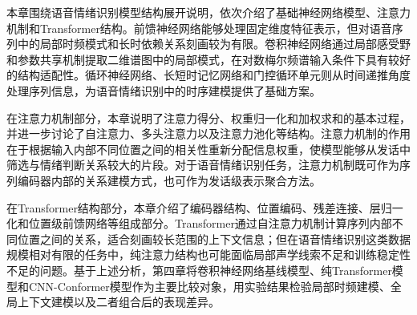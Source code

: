 本章围绕语音情绪识别模型结构展开说明，依次介绍了基础神经网络模型、注意力机制和Transformer结构。前馈神经网络能够处理固定维度特征表示，但对语音序列中的局部时频模式和长时依赖关系刻画较为有限。卷积神经网络通过局部感受野和参数共享机制提取二维谱图中的局部模式，在对数梅尔频谱输入条件下具有较好的结构适配性。循环神经网络、长短时记忆网络和门控循环单元则从时间递推角度处理序列信息，为语音情绪识别中的时序建模提供了基础方案。

在注意力机制部分，本章说明了注意力得分、权重归一化和加权求和的基本过程，并进一步讨论了自注意力、多头注意力以及注意力池化等结构。注意力机制的作用在于根据输入内部不同位置之间的相关性重新分配信息权重，使模型能够从发话中筛选与情绪判断关系较大的片段。对于语音情绪识别任务，注意力机制既可作为序列编码器内部的关系建模方式，也可作为发话级表示聚合方法。

在Transformer结构部分，本章介绍了编码器结构、位置编码、残差连接、层归一化和位置级前馈网络等组成部分。Transformer通过自注意力机制计算序列内部不同位置之间的关系，适合刻画较长范围的上下文信息；但在语音情绪识别这类数据规模相对有限的任务中，纯注意力结构也可能面临局部声学线索不足和训练稳定性不足的问题。基于上述分析，第四章将卷积神经网络基线模型、纯Transformer模型和CNN-Conformer模型作为主要比较对象，用实验结果检验局部时频建模、全局上下文建模以及二者组合后的表现差异。
